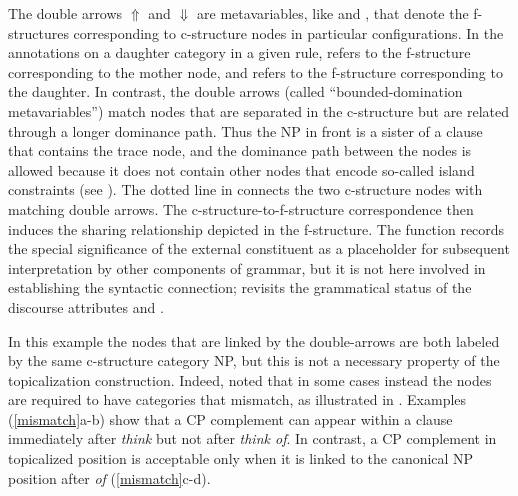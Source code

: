\documentclass[output=paper,hidelinks]{langscibook}
\begin{document}
\ea \label{rules}
\ea\label{Sbarrule}
  
\ex\label{NPrule} {}

\ex\label{VPrule}
          {  }
\z\z

\noindent The double arrows $\Uparrow$ and $\Downarrow$ are metavariables, like \UP and \DOWN, that denote the f-structures corresponding to c-structure nodes in particular configurations. In the annotations on a daughter category in a given rule, \UP refers to the f-structure corresponding to the mother node, and \DOWN refers to the f-structure corresponding to the daughter.  In contrast, the double arrows (called ``bounded-domination metavariables'')  match nodes that are separated in the c-structure but are related through a longer dominance path. Thus the NP in front is a sister of a clause that contains the trace node, and the dominance path between the nodes is allowed because it does not contain other nodes that encode so-called island constraints (see ). The dotted line in  connects the two c-structure nodes with matching double arrows. The c-structure-to-f-structure correspondence then induces the sharing relationship depicted in the f-structure. The \TOPIC function records the special significance of the external constituent as a placeholder for subsequent interpretation by other components of grammar, but it is not here involved in establishing the syntactic connection;  revisits the grammatical status of the discourse attributes \TOPIC and \FOCUS.

\largerpage
In this example the nodes that are linked by the double-arrows are both labeled by the same c-structure category NP, but this is not a necessary property of the topicalization construction.   Indeed, \citet{kaplanbresnan82} noted that in some cases instead the nodes are required to have categories that mismatch, as illustrated in .   Examples (\ref{mismatch}a-b) show that a CP complement can appear within a clause immediately after \textit{think} but not after \textit{think of}. In contrast, a CP complement in topicalized position is acceptable only when it is linked to the canonical NP position after \textit{of} (\ref{mismatch}c-d).  
\end{document}
